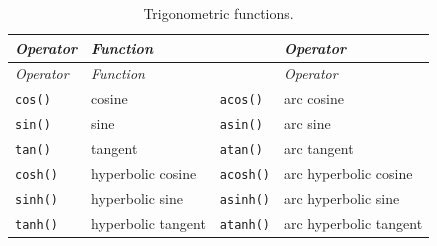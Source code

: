 \documentclass[
]{book}
\begin{document}
\begin{longtable}[]{@{}
  >{\raggedright\arraybackslash}p{}
  >{\raggedright\arraybackslash}p{}
  >{\raggedright\arraybackslash}p{}
  >{\raggedright\arraybackslash}p{}@{}}
\caption{\label{tab:TrigFunc} Trigonometric functions.}\tabularnewline
\toprule\noalign{}
\begin{minipage}[b]{\linewidth}\raggedright
\emph{{Operator}}
\end{minipage} & \begin{minipage}[b]{\linewidth}\raggedright
\emph{{Function}}
\end{minipage} & \begin{minipage}[b]{\linewidth}\raggedright
\end{minipage} & \begin{minipage}[b]{\linewidth}\raggedright
\emph{{Operator}}
\end{minipage} \\
\midrule\noalign{}
\endfirsthead
\toprule\noalign{}
\begin{minipage}[b]{\linewidth}\raggedright
\emph{{Operator}}
\end{minipage} & \begin{minipage}[b]{\linewidth}\raggedright
\emph{{Function}}
\end{minipage} & \begin{minipage}[b]{\linewidth}\raggedright
\end{minipage} & \begin{minipage}[b]{\linewidth}\raggedright
\emph{{Operator}}
\end{minipage} \\
\midrule\noalign{}
\endhead
\bottomrule\noalign{}
\endlastfoot
\texttt{cos()} & cosine & \texttt{acos()} & arc cosine \\
\texttt{sin()} & sine & \texttt{asin()} & arc sine \\
\texttt{tan()} & tangent & \texttt{atan()} & arc tangent \\
\texttt{cosh()} & hyperbolic cosine & \texttt{acosh()} & arc hyperbolic cosine \\
\texttt{sinh()} & hyperbolic sine & \texttt{asinh()} & arc hyperbolic sine \\
\texttt{tanh()} & hyperbolic tangent & \texttt{atanh()} & arc hyperbolic tangent \\
\end{longtable}
\end{document}
